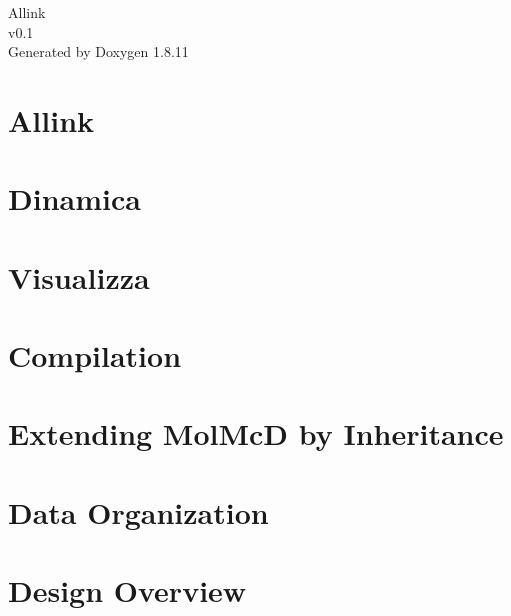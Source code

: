 \documentclass[twoside]{article}
\newcommand{\+}{\discretionary{\mbox{\scriptsize$\hookleftarrow$}}{}{}}
\begin{document}
\hypersetup{pageanchor=false,
             bookmarksnumbered=true,
             pdfencoding=unicode
            }
\begin{titlepage}
\vspace*{7cm}
\begin{center}%
{\Large Allink \\[1ex]\large v0.\+1 }\\
\vspace*{1cm}
{\large Generated by Doxygen 1.8.11}\\
\end{center}
\end{titlepage}
\tableofcontents
{}
\hypersetup{pageanchor=true}

\section{Allink}
\label{index}\hypertarget{index}{}
\section{Dinamica}
\label{Dinamica_page}
\hypertarget{Dinamica_page}{}

\section{Visualizza}
\label{Visualizza_page}
\hypertarget{Visualizza_page}{}

\section{Compilation}
\label{compile_page}
\hypertarget{compile_page}{}

\section{Extending Mol\+McD by Inheritance}
\label{extension_page}
\hypertarget{extension_page}{}

\section{Data Organization}
\label{data_page}
\hypertarget{data_page}{}

\section{Design Overview}
\label{design_page}
\hypertarget{design_page}{}

\end{document}
